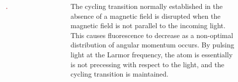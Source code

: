 \documentclass[
30pt,%
a1paper, 
landscape,%
margin = 0mm,
innermargin = -2cm,
colspace = 5mm,
subcolspace = 0mm,
blockverticalspace=.5cm %
]{tikzposter}
\begin{document}
\begin{columns}
{\begin{figure}
		\begin{tikzfigure}[]
			\vspace{1.5cm}
			\includegraphics[width=0.10\textwidth]{Images/precession.png}
		\end{tikzfigure}
\end{figure}
\vspace{-3cm}
The cycling transition normally established in the absence of a magnetic field is disrupted when the magnetic field is not parallel to the incoming light. This causes fluorescence to decrease as a non-optimal distribution of angular momentum occurs. By pulsing light at the Larmor frequency, the atom is essentially is not precessing with respect to the light, and the cycling transition is maintained.



	
	}



\end{columns}
\end{document}
